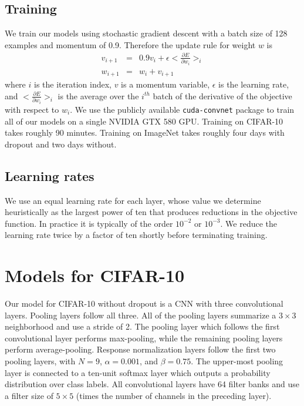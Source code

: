 \documentclass[12pt]{article}
\begin{document}
\subsection{Training}

We train our models using stochastic gradient descent with a batch
size of 128 examples and momentum of 0.9. Therefore the update rule
for weight $w$ is
\begin{eqnarray*}
v_{i+1} & = & 0.9 v_{i}+\epsilon<\frac{\partial E}{\partial w_{i}}>_{i}\\
w_{i+1} & = & w_{i}+v_{i+1}
\end{eqnarray*}
where $i$ is the iteration index, $v$ is a momentum variable, $\epsilon$
is the learning rate, and $<\frac{\partial E}{\partial w_{i}}>_{i}$
is the average over the $i^{th}$ batch of the derivative of the objective
with respect to $w_{i}$. We use the publicly available \texttt{cuda-convnet}
package to train all of our models on a single NVIDIA GTX 580 GPU.
Training on CIFAR-10 takes roughly 90 minutes. Training on ImageNet
takes roughly four days with dropout and two days without.


\subsection{Learning rates}

We use an equal learning rate for each layer, whose value we determine
heuristically as the largest power of ten that produces reductions
in the objective function. In practice it is typically of the order
$10^{-2}$ or $10^{-3}$. We reduce the learning rate twice by a
factor of ten shortly before terminating training.


\section{Models for CIFAR-10}

Our model for CIFAR-10 without dropout is a CNN with three convolutional
layers. Pooling layers follow all three. All of the pooling layers
summarize a $3\times3$ neighborhood and use a stride of 2. The pooling
layer which follows the first convolutional layer performs max-pooling,
while the remaining pooling layers perform average-pooling. Response
normalization layers follow the first two pooling layers, with $N=9$,
$\alpha=0.001$, and $\beta=0.75$. The upper-most pooling layer is
connected to a ten-unit softmax layer which outputs a probability
distribution over class labels. All convolutional layers have 64 filter banks
and use a filter size of $5\times5$ (times the number of channels
in the preceding layer).
\end{document}

